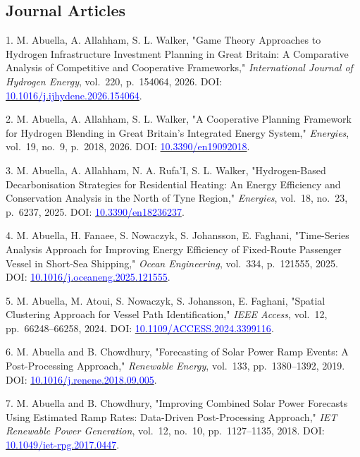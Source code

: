 \documentclass[11pt,letterpaper,sans]{moderncv}
\begin{document}
\subsection*{Journal Articles}

1. M. Abuella, A. Allahham, S. L. Walker,
"Game Theory Approaches to Hydrogen Infrastructure Investment Planning in Great Britain: A Comparative Analysis of Competitive and Cooperative Frameworks,"
\textit{International Journal of Hydrogen Energy}, vol.~220, p.~154064, 2026.
DOI: \href{https://doi.org/10.1016/j.ijhydene.2026.154064}{\textcolor{blue}{10.1016/j.ijhydene.2026.154064}}.

2. M. Abuella, A. Allahham, S. L. Walker,
"A Cooperative Planning Framework for Hydrogen Blending in Great Britain's Integrated Energy System,"
\textit{Energies}, vol.~19, no.~9, p.~2018, 2026.
DOI: \href{https://doi.org/10.3390/en19092018}{\textcolor{blue}{10.3390/en19092018}}.

3. M. Abuella, A. Allahham, N. A. Rufa'I, S. L. Walker,
"Hydrogen-Based Decarbonisation Strategies for Residential Heating: An Energy Efficiency and Conservation Analysis in the North of Tyne Region,"
\textit{Energies}, vol.~18, no.~23, p.~6237, 2025.
DOI: \href{https://doi.org/10.3390/en18236237}{\textcolor{blue}{10.3390/en18236237}}.

4. M. Abuella, H. Fanaee, S. Nowaczyk, S. Johansson, E. Faghani,
"Time-Series Analysis Approach for Improving Energy Efficiency of Fixed-Route Passenger Vessel in Short-Sea Shipping,"
\textit{Ocean Engineering}, vol.~334, p.~121555, 2025.
DOI: \href{https://doi.org/10.1016/j.oceaneng.2025.121555}{\textcolor{blue}{10.1016/j.oceaneng.2025.121555}}.

5. M. Abuella, M. Atoui, S. Nowaczyk, S. Johansson, E. Faghani,
"Spatial Clustering Approach for Vessel Path Identification,"
\textit{IEEE Access}, vol.~12, pp.~66248--66258, 2024.
DOI: \href{https://doi.org/10.1109/ACCESS.2024.3399116}{\textcolor{blue}{10.1109/ACCESS.2024.3399116}}.

6. M. Abuella and B. Chowdhury,
"Forecasting of Solar Power Ramp Events: A Post-Processing Approach,"
\textit{Renewable Energy}, vol.~133, pp.~1380--1392, 2019.
DOI: \href{https://doi.org/10.1016/j.renene.2018.09.005}{\textcolor{blue}{10.1016/j.renene.2018.09.005}}.

7. M. Abuella and B. Chowdhury,
"Improving Combined Solar Power Forecasts Using Estimated Ramp Rates: Data-Driven Post-Processing Approach,"
\textit{IET Renewable Power Generation}, vol.~12, no.~10, pp.~1127--1135, 2018.
DOI: \href{https://doi.org/10.1049/iet-rpg.2017.0447}{\textcolor{blue}{10.1049/iet-rpg.2017.0447}}.
\end{document}
